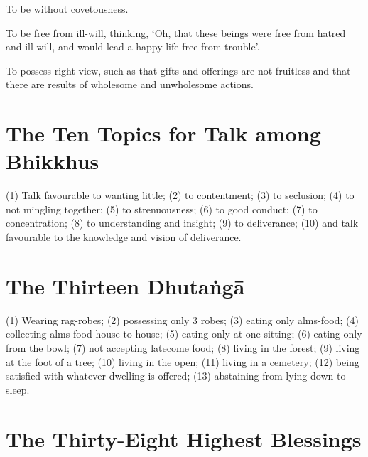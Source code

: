 To be without covetousness.

To be free from ill-will, thinking, ‘Oh, that these beings were free from hatred
and ill-will, and would lead a happy life free from trouble’.

To possess right view, such as that gifts and offerings are not fruitless and
that there are results of wholesome and unwholesome actions.


\ifhandbookedition
\vspace*{-\baselineskip}
\fi

\section*{The Ten Topics for Talk among Bhikkhus}

(1) Talk favourable to wanting little;
(2) to contentment;
(3) to seclusion;
(4) to not mingling together;
(5) to strenuousness;
(6) to good conduct;
(7) to concentration;
(8) to understanding and insight;
(9) to deliverance;
(10) and talk favourable to the knowledge and vision of deliverance.


\ifhandbookedition
\vspace*{-\baselineskip}
\fi

\section*{The Thirteen Dhutaṅgā}

(1) Wearing rag-robes;
(2) possessing only 3 robes;
(3) eating only alms-food;
(4) collecting alms-food house-to-house;
(5) eating only at one sitting;
(6) eating only from the bowl;
(7) not accepting latecome food;
(8) living in the forest;
(9) living at the foot of a tree;
(10) living in the open;
(11) living in a cemetery;
(12) being satisfied with whatever dwelling is offered;
(13) abstaining from lying down to sleep.


\ifhandbookedition
\vspace*{-\baselineskip}
\fi

\section*{The Thirty-Eight Highest Blessings}


